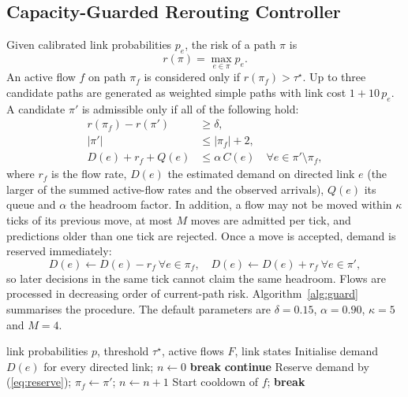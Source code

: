 \documentclass[conference]{IEEEtran}
\begin{document}
\subsection{Capacity-Guarded Rerouting Controller}
Given calibrated link probabilities $p_e$, the risk of a path $\pi$ is
\begin{equation}
r(\pi)=\max_{e\in\pi} p_e .
\label{eq:risk}
\end{equation}
An active flow $f$ on path $\pi_f$ is considered only if $r(\pi_f)>\tau^\star$. Up to three candidate paths are generated as weighted simple paths with link cost $1+10\,p_e$. A candidate $\pi'$ is admissible only if all of the following hold:
\begin{align}
r(\pi_f)-r(\pi') &\ge \delta, \label{eq:improve}\\
|\pi'| &\le |\pi_f|+2, \label{eq:stretch}\\
D(e)+r_f+Q(e) &\le \alpha\, C(e)\quad \forall e\in \pi'\setminus\pi_f, \label{eq:capacity}
\end{align}
where $r_f$ is the flow rate, $D(e)$ the estimated demand on directed link $e$ (the larger of the summed active-flow rates and the observed arrivals), $Q(e)$ its queue and $\alpha$ the headroom factor. In addition, a flow may not be moved within $\kappa$ ticks of its previous move, at most $M$ moves are admitted per tick, and predictions older than one tick are rejected. Once a move is accepted, demand is reserved immediately:
\begin{equation}
D(e)\leftarrow D(e)-r_f\ \forall e\in\pi_f,\quad D(e)\leftarrow D(e)+r_f\ \forall e\in\pi',
\label{eq:reserve}
\end{equation}
so later decisions in the same tick cannot claim the same headroom. Flows are processed in decreasing order of current-path risk. Algorithm~\ref{alg:guard} summarises the procedure. The default parameters are $\delta=0.15$, $\alpha=0.90$, $\kappa=5$ and $M=4$.

\begin{algorithm}[!t]
\caption{Capacity-guarded rerouting (one tick)}
\label{alg:guard}
\footnotesize
\begin{algorithmic}[1]
\REQUIRE link probabilities $p$, threshold $\tau^\star$, active flows $F$, link states
\STATE Initialise demand $D(e)$ for every directed link; $n \leftarrow 0$
   \STATE \textbf{break} \ENDIF
   \STATE \textbf{continue} \ENDIF
      \STATE Reserve demand by (\ref{eq:reserve}); $\pi_f \leftarrow \pi'$; $n \leftarrow n+1$
      \STATE Start cooldown of $f$; \textbf{break}
    \ENDIF
  \ENDFOR
\ENDFOR
\end{algorithmic}
\end{algorithm}
\end{document}
